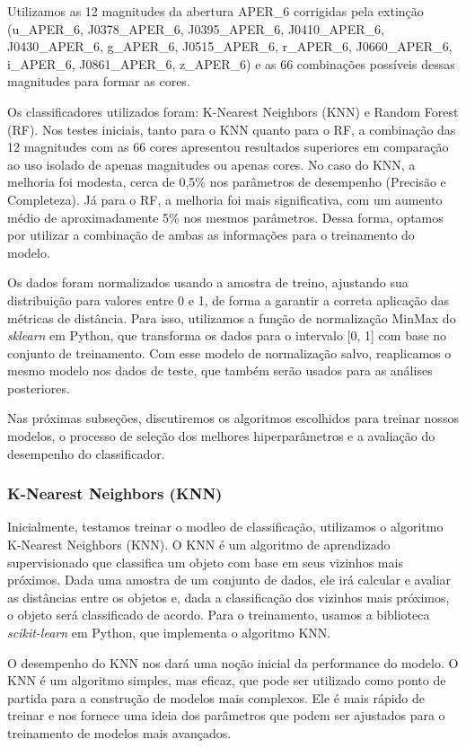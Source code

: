\raggedright
Utilizamos as 12 magnitudes da abertura APER\_6 corrigidas pela extinção (u\_APER\_6, J0378\_APER\_6, J0395\_APER\_6, J0410\_APER\_6, J0430\_APER\_6, g\_APER\_6, J0515\_APER\_6, r\_APER\_6, J0660\_APER\_6, i\_APER\_6, J0861\_APER\_6, z\_APER\_6) e as 66 combinações possíveis dessas magnitudes para formar as cores.

Os classificadores utilizados foram: K-Nearest Neighbors (KNN) e Random Forest (RF). Nos testes iniciais, tanto para o KNN quanto para o RF, a combinação das 12 magnitudes com as 66 cores apresentou resultados superiores em comparação ao uso isolado de apenas magnitudes ou apenas cores. No caso do KNN, a melhoria foi modesta, cerca de 0,5\% nos parâmetros de desempenho (Precisão e Completeza). Já para o RF, a melhoria foi mais significativa, com um aumento médio de aproximadamente 5\% nos mesmos parâmetros. Dessa forma, optamos por utilizar a combinação de ambas as informações para o treinamento do modelo.

Os dados foram normalizados usando a amostra de treino, ajustando sua distribuição para valores entre 0 e 1, de forma a garantir a correta aplicação das métricas de distância. Para isso, utilizamos a função de normalização MinMax do \textit{sklearn} em Python, que transforma os dados para o intervalo [0, 1] com base no conjunto de treinamento. Com esse modelo de normalização salvo, reaplicamos o mesmo modelo nos dados de teste, que também serão usados para as análises posteriores.

Nas próximas subseções, discutiremos os algoritmos escolhidos para treinar nossos modelos, o processo de seleção dos melhores hiperparâmetros e a avaliação do desempenho do classificador.

\subsubsection*{K-Nearest Neighbors (KNN)}\label{subsubsec:knn}
Inicialmente, testamos treinar o modleo de classificação, utilizamos o algoritmo K-Nearest Neighbors (KNN). O KNN é um algoritmo de aprendizado supervisionado que classifica um objeto com base em seus vizinhos mais próximos. Dada uma amostra de um conjunto de dados, ele irá calcular e avaliar as distâncias entre os objetos e, dada a classificação dos vizinhos mais próximos, o objeto será classificado de acordo. Para o treinamento, usamos a biblioteca \textit{scikit-learn} em Python, que implementa o algoritmo KNN.

O desempenho do KNN nos dará uma noção inicial da performance do modelo. O KNN é um algoritmo simples, mas eficaz, que pode ser utilizado como ponto de partida para a construção de modelos mais complexos. Ele é mais rápido de treinar e nos fornece uma ideia dos parâmetros que podem ser ajustados para o treinamento de modelos mais avançados.

